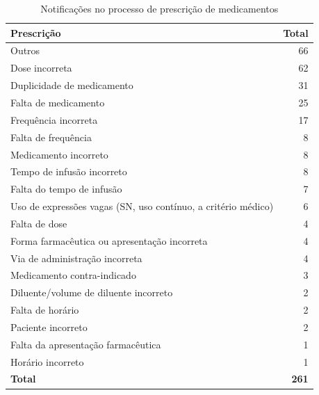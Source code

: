 \documentclass[
  a4paper]{article}
\begin{document}
\begin{table}[H]

\caption{\label{tab:unnamed-chunk-35}Notificações no processo de prescrição de medicamentos}
\centering
\begin{tabular}[t]{lr}
\toprule
Prescrição & Total\\
\midrule
Outros & 66\\
Dose incorreta & 62\\
Duplicidade de medicamento & 31\\
Falta de medicamento & 25\\
Frequência incorreta & 17\\
\addlinespace
Falta de frequência & 8\\
Medicamento incorreto & 8\\
Tempo de infusão incorreto & 8\\
Falta do tempo de infusão & 7\\
Uso de expressões vagas (SN, uso contínuo, a critério médico) & 6\\
\addlinespace
Falta de dose & 4\\
Forma farmacêutica ou apresentação incorreta & 4\\
Via de administração incorreta & 4\\
Medicamento contra-indicado & 3\\
Diluente/volume de diluente incorreto & 2\\
\addlinespace
Falta de horário & 2\\
Paciente incorreto & 2\\
Falta da apresentação farmacêutica & 1\\
Horário incorreto & 1\\
\midrule
\textbf{Total} & \textbf{261}\\
\bottomrule
\end{tabular}
\end{table}
\end{document}

